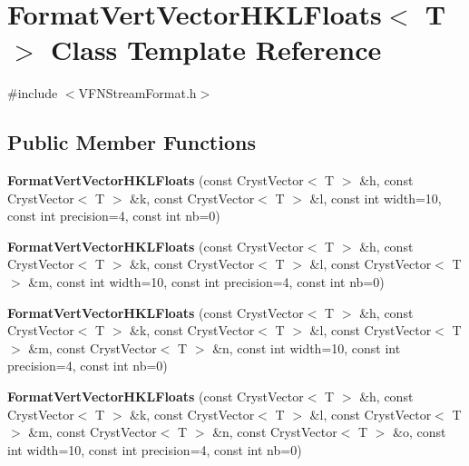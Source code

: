 \hypertarget{class_format_vert_vector_h_k_l_floats}{}\section{Format\+Vert\+Vector\+H\+K\+L\+Floats$<$ T $>$ Class Template Reference}
\label{class_format_vert_vector_h_k_l_floats}


{\ttfamily \#include $<$V\+F\+N\+Stream\+Format.\+h$>$}

\subsection*{Public Member Functions}
\begin{DoxyCompactItemize}
\item 
\mbox{\label{class_format_vert_vector_h_k_l_floats_afa2957ec620478e69fdd778cba1c8cf8}} 
{\bfseries Format\+Vert\+Vector\+H\+K\+L\+Floats} (const Cryst\+Vector$<$ T $>$ \&h, const Cryst\+Vector$<$ T $>$ \&k, const Cryst\+Vector$<$ T $>$ \&l, const int width=10, const int precision=4, const int nb=0)
\item 
\mbox{\label{class_format_vert_vector_h_k_l_floats_aacc9753b87a2f0a8c4c11f949b156864}} 
{\bfseries Format\+Vert\+Vector\+H\+K\+L\+Floats} (const Cryst\+Vector$<$ T $>$ \&h, const Cryst\+Vector$<$ T $>$ \&k, const Cryst\+Vector$<$ T $>$ \&l, const Cryst\+Vector$<$ T $>$ \&m, const int width=10, const int precision=4, const int nb=0)
\item 
\mbox{\label{class_format_vert_vector_h_k_l_floats_a923c784563e9d96f8103fb91b62abab4}} 
{\bfseries Format\+Vert\+Vector\+H\+K\+L\+Floats} (const Cryst\+Vector$<$ T $>$ \&h, const Cryst\+Vector$<$ T $>$ \&k, const Cryst\+Vector$<$ T $>$ \&l, const Cryst\+Vector$<$ T $>$ \&m, const Cryst\+Vector$<$ T $>$ \&n, const int width=10, const int precision=4, const int nb=0)
\item 
\mbox{\label{class_format_vert_vector_h_k_l_floats_a7b89592f4467aa07654a94294212e1be}} 
{\bfseries Format\+Vert\+Vector\+H\+K\+L\+Floats} (const Cryst\+Vector$<$ T $>$ \&h, const Cryst\+Vector$<$ T $>$ \&k, const Cryst\+Vector$<$ T $>$ \&l, const Cryst\+Vector$<$ T $>$ \&m, const Cryst\+Vector$<$ T $>$ \&n, const Cryst\+Vector$<$ T $>$ \&o, const int width=10, const int precision=4, const int nb=0)

\end{DoxyCompactItemize}
